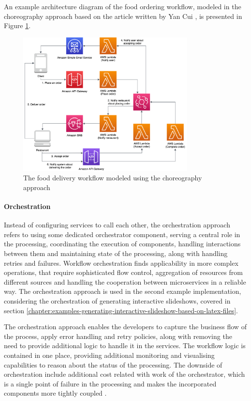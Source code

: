 An example architecture diagram of the food ordering workflow, modeled in the choreography approach based on the article written by Yan Cui \cite{ChoreographyVsOrchestrationInTheLandOfServerless}, is presented in Figure \ref{fig:choreography-diagram}.

\begin{figure}[H]
   \centering
   \includegraphics[width=0.8\textwidth]{assets/04-serverless-for-web-apps/choreography.png}
   \caption{The food delivery workflow modeled using the choreography approach}
   \label{fig:choreography-diagram}
\end{figure}

\paragraph{Orchestration}

Instead of configuring services to call each other, the orchestration approach refers to using some dedicated orchestrator component, serving a central role in the processing, coordinating the execution of components, handling interactions between them and maintaining state of the processing, along with handling retries and failures.
Workflow orchestration finds applicability in more complex operations, that require sophisticated flow control, aggregation of resources from different sources and handling the cooperation between microservices in a reliable way.
The orchestration approach is used in the second example implementation, considering the orchestration of generating interactive slideshows, covered in section \ref{chapter:examples-generating-interactive-slideshow-based-on-latex-files}.

The orchestration approach enables the developers to capture the business flow of the process, apply error handling and retry policies, along with removing the need to provide additional logic to handle it in the services.
The workflow logic is contained in one place, providing additional monitoring and visualising capabilities to reason about the status of the processing.
The downside of orchestration include additional cost related with work of the orchestrator, which is a single point of failure in the processing and makes the incorporated components more tightly coupled \cite{ChoreographyVsOrchestrationInServerlessMicroservices}.

